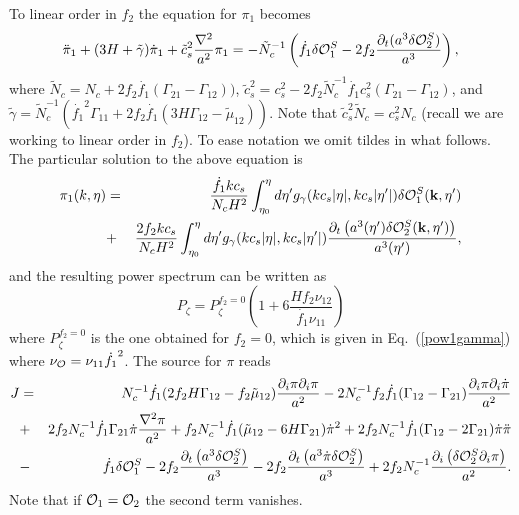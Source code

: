 \documentclass[11pt,amsmath,floats,floatfix,nofootinbib,secnumarabic, superscriptaddress, tightenlines]{revtex4}
\newcommand{\be}{\begin{equation}}
\newcommand{\ee}{\end{equation}}
\newcommand{\lp}{\left(}
\newcommand{\rp}{\right)}
\newcommand{\calo}{{\cal O}}
\begin{document}
{To linear order in $f_2$ the equation for $\pi_1$ becomes
\be
\ddot{\pi}_1+(3H+\tilde{\gamma})\dot{\pi}_1+\tilde{c}_s^2\frac{\nabla^2}{a^2}\pi_1=-\tilde{N}_c^{-1}
\left(\dot{f_1}\delta\calo_1^S-2f_2\frac{\partial_t(a^3\delta\calo_2^S)}{a^3}\right),
\ee where $\tilde{N}_c=N_c+2f_2\dot{f_1}(\Gamma_{21}-\Gamma_{12}))$,  $\tilde{c}_s^2={c}_s^2-2f_2\tilde{N}_c^{-1}\dot{f_1}c_s^2(\Gamma_{21}-\Gamma_{12})$,
and $\tilde{\gamma}= \tilde{N}_c^{-1}\left(\dot{f_1}^2\Gamma_{11}+2f_2\dot{f_1}(3H\Gamma_{12}-\tilde{\mu}_{12})\right)$. Note that  $\tilde{c}_s^2\tilde{N}_c=c_s^2N_c $
(recall we are working to linear order in $f_2$). To ease notation we omit tildes in what follows. The particular solution to the above equation is
\begin{eqnarray}
\pi_1(k,\eta)&=&\frac{\dot{f_1} k c_s}{N_cH^2}\int^{\eta}_{\eta_0} d\eta'g_{\gamma}(kc_s|\eta|,kc_s|\eta'|)\delta\calo_1^S({\bf k},\eta')\nonumber\\
&+&\frac{2 f_2 k c_s}{N_cH^2}\int^{\eta}_{\eta_0} d\eta'g_{\gamma}(kc_s|\eta|,kc_s|\eta'|)\frac{\partial_t \lp a^3(\eta')\delta\calo_2^S({\bf k},\eta')\rp}{a^3(\eta')},
\end{eqnarray}
and the resulting  power spectrum can be written as
\be
P_{\zeta}=P_{\zeta}^{f_2=0}\lp 1+6\frac{H f_2\nu_{12}} {\dot{f_1}\nu_{11}}\rp
\ee where $P_{\zeta}^{f_2=0}$ is the one obtained for $f_2=0$, which is given in Eq.~(\ref{pow1gamma}) where $\nu_\calo=\nu_{11}\dot{f_1}^2$. The source for $\pi$ reads
\begin{eqnarray}
J&=&N_c^{-1}\dot{f_1}(2f_2H\Gamma_{12}-f_2\tilde{\mu}_{12}) \frac{\partial_i\pi\partial_i{\pi}}{a^2}-2N_c^{-1} f_2\dot{f_1}(\Gamma_{12}-\Gamma_{21})\frac{\partial_i\pi\partial_i\dot{\pi}}{a^2}\nonumber\\
&+&2f_2N_c^{-1}\dot{f_1}\Gamma_{21} \dot{\pi}\frac{\nabla^2\pi}{a^2}+f_2N_c^{-1}\dot{f_1}(\tilde{\mu}_{12}-6H\Gamma_{21})\dot{\pi}^2+2f_2N_c^{-1}\dot{f_1}(\Gamma_{12}-2\Gamma_{21})\dot{\pi}\ddot{\pi}\nonumber\\
&-&\dot{f_1}\delta\calo_1^S-2f_2\frac{\partial_t\lp a^3\delta\calo_2^S\rp}{a^3}-2f_2\frac{\partial_t\lp a^3\dot{\pi}\delta\calo_2^S\rp}{a^3}+2f_2N_c^{-1}\frac{\partial_i\lp\delta\calo_2^S\partial_i\pi\rp}{a^2}.\label{mixsource}
\end{eqnarray}
Note that if $\calo_1=\calo_2$ the second term vanishes.\\

}
\end{document}
